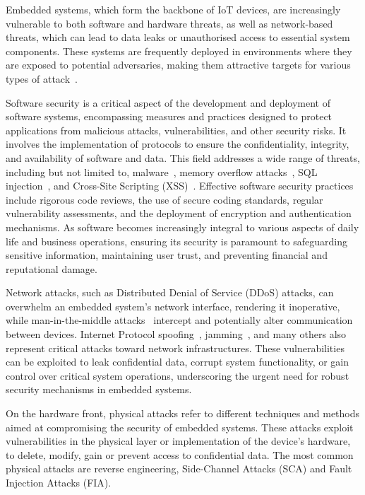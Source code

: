 Embedded systems, which form the backbone of IoT devices, are increasingly vulnerable to both software and hardware threats, as well as network-based threats, which can lead to data leaks or unauthorised access to essential system components. These systems are frequently deployed in environments where they are exposed to potential adversaries, making them attractive targets for various types of attack~\cite{MW-19-compnet, EAJJMB-22-compscrev}.

Software security is a critical aspect of the development and deployment of software systems, encompassing measures and practices designed to protect applications from malicious attacks, vulnerabilities, and other security risks. It involves the implementation of protocols to ensure the confidentiality, integrity, and availability of software and data. This field addresses a wide range of threats, including but not limited to, malware~\cite{FIMI-23-access}, memory overflow attacks~\cite{CWCBW-00-discex}, SQL injection~\cite{DGWKU-16-notere}, and Cross-Site Scripting (XSS)~\cite{ST-12-computer}. Effective software security practices include rigorous code reviews, the use of secure coding standards, regular vulnerability assessments, and the deployment of encryption and authentication mechanisms. As software becomes increasingly integral to various aspects of daily life and business operations, ensuring its security is paramount to safeguarding sensitive information, maintaining user trust, and preventing financial and reputational damage.

Network attacks, such as Distributed Denial of Service (DDoS) attacks, can overwhelm an embedded system's network interface, rendering it inoperative, while man-in-the-middle attacks~\cite{CDL-16-commsurtuto} intercept and potentially alter communication between devices. Internet Protocol spoofing~\cite{MRT-10-isf}, jamming~\cite{PZ-22-commsurtuto}, and many others also represent critical attacks toward network infrastructures. These vulnerabilities can be exploited to leak confidential data, corrupt system functionality, or gain control over critical system operations, underscoring the urgent need for robust security mechanisms in embedded systems.

On the hardware front, physical attacks refer to different techniques and methods aimed at compromising the security of embedded systems. These attacks exploit vulnerabilities in the physical layer or implementation of the device’s hardware, to delete, modify, gain or prevent access to confidential data.
The most common physical attacks are reverse engineering, Side-Channel Attacks (SCA) and Fault Injection Attacks (FIA).

